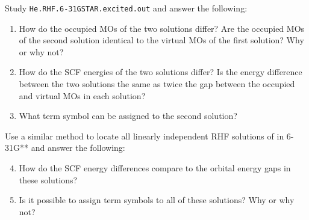 				\begin{Task}
					Study \texttt{He.RHF.6-31GSTAR.excited.out} and answer the following:
						\begin{enumerate}[topsep=0pt,itemsep=-1ex,partopsep=1ex,parsep=1ex,label=(\alph*)]
							\item How do the occupied MOs of the two solutions differ? Are the occupied MOs of the second solution identical to the virtual MOs of the first solution? Why or why not?
							\item How do the SCF energies of the two solutions differ? Is the energy difference between the two solutions the same as twice the gap between the occupied and virtual MOs in each solution?
							\item What term symbol can be assigned to the second solution?
						\end{enumerate}
					Use a similar method to locate all linearly independent RHF solutions of  in 6-31G** and answer the following:
						\begin{enumerate}[topsep=0pt,itemsep=-1ex,partopsep=1ex,parsep=1ex,label=(\alph*)]
							\setcounter{enumi}{3}
							\item How do the SCF energy differences compare to the orbital energy gaps in these solutions?
							\item Is it possible to assign term symbols to all of these solutions? Why or why not?
						\end{enumerate}
				\end{Task}			